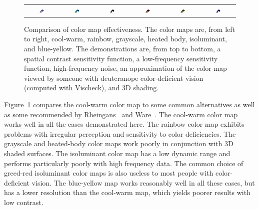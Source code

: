 \documentclass{llncs}
\newcommand{\scite}[1]{~\cite{#1}}
\begin{document}
\begin{figure}
\begin{tabular}{c@{\,}c@{\,}c@{\,}c@{\,}c@{\,}c}
    \includegraphics[width=0.16\textwidth]{images/Cool2WarmShading} &
    \includegraphics[width=0.16\textwidth]{images/RainbowShading} &
    \includegraphics[width=0.16\textwidth]{images/GrayscaleShading} &
    \includegraphics[width=0.16\textwidth]{images/BlackBodyShading} &
    \includegraphics[width=0.16\textwidth]{images/Green2RedShading} &
    \includegraphics[width=0.16\textwidth]{images/Blue2YellowShading}
  \end{tabular}
  \caption{Comparison of color map effectiveness.  The color maps are, from
    left to right, cool-warm, rainbow, grayscale, heated body, isoluminant,
    and blue-yellow.  The demonstrations are, from top to bottom, a spatial
    contrast sensitivity function, a low-frequency sensitivity function,
    high-frequency noise, an approximation of the color map viewed by
    someone with deuteranope color-deficient vision (computed with
    Vischeck), and 3D shading.}
  \label{fig:MapComparison}
\end{figure}

Figure~\ref{fig:MapComparison} compares the cool-warm color map to some
common alternatives as well as some recommended by
Rheingans\scite{Rheingans99} and Ware\scite{Ware04}.  The cool-warm color
map works well in all the cases demonstrated here.  The rainbow color map
exhibits problems with irregular perception and sensitivity to color
deficiencies.  The grayscale and heated-body color maps work poorly in
conjunction with 3D shaded surfaces.  The isoluminant color map has a low
dynamic range and performs particularly poorly with high frequency data.
The common choice of greed-red isoluminant color maps is also useless to
most people with color-deficient vision.  The blue-yellow map works
reasonably well in all these cases, but has a lower resolution than the
cool-warm map, which yields poorer results with low contrast.
\end{document}
